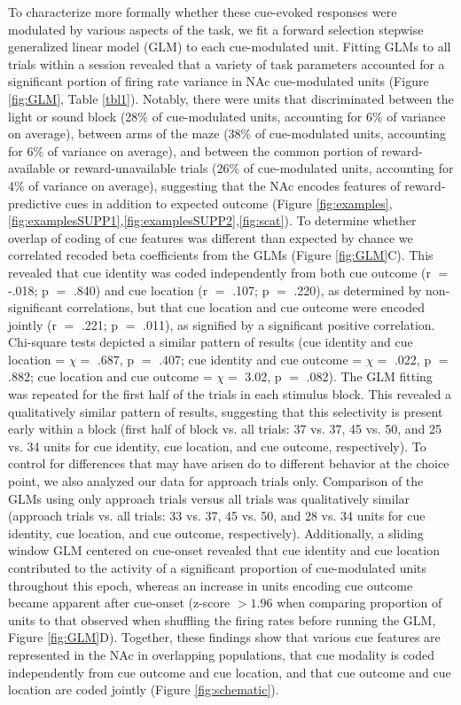 \documentclass[11pt]{article}
\begin{document}
To characterize more formally whether these cue-evoked responses were
modulated by various aspects of the task, we fit a forward selection
stepwise generalized linear model (GLM) to each cue-modulated
unit. Fitting GLMs to all trials within a session revealed that a
variety of task parameters accounted for a significant portion of
firing rate variance in NAc cue-modulated units (Figure \ref{fig:GLM},
Table \ref{tbl1}). Notably, there were units that discriminated
between the light or sound block (28\% of cue-modulated units,
accounting for 6\% of variance on average), between arms of the maze
(38\% of cue-modulated units, accounting for 6\% of variance on
average), and between the common portion of reward-available or
reward-unavailable trials (26\% of cue-modulated units, accounting for
4\% of variance on average), suggesting that the NAc encodes features
of reward-predictive cues in addition to expected outcome (Figure
\ref{fig:examples},\ref{fig:examplesSUPP1},\ref{fig:examplesSUPP2},\ref{fig:scat}). To
determine whether overlap of coding of cue features was different than
expected by chance we correlated recoded beta coefficients from the
GLMs (Figure \ref{fig:GLM}C). This revealed that cue identity was
coded independently from both cue outcome (r $=$ -.018; p $=$ .840)
and cue location (r $=$ .107; p $=$ .220), as determined by
non-significant correlations, but that cue location and cue outcome
were encoded jointly (r $=$ .221; p $=$ .011), as signified by a
significant positive correlation. Chi-square tests depicted a similar
pattern of results (cue identity and cue location = $\chi =$ .687, p
$=$ .407; cue identity and cue outcome = $\chi =$ .022, p $=$ .882;
cue location and cue outcome = $\chi =$ 3.02, p $=$ .082). The GLM
fitting was repeated for the first half of the trials in each stimulus
block. This revealed a qualitatively similar pattern of results,
suggesting that this selectivity is present early within a block
(first half of block vs. all trials: 37 vs. 37, 45 vs. 50, and 25
vs. 34 units for cue identity, cue location, and cue outcome,
respectively). To control for differences that may have arisen do to
different behavior at the choice point, we also analyzed our data for
approach trials only. Comparison of the GLMs using only approach
trials versus all trials was qualitatively similar (approach trials
vs. all trials: 33 vs. 37, 45 vs. 50, and 28 vs. 34 units for cue
identity, cue location, and cue outcome, respectively).  Additionally,
a sliding window GLM centered on cue-onset revealed that cue identity
and cue location contributed to the activity of a significant
proportion of cue-modulated units throughout this epoch, whereas an
increase in units encoding cue outcome became apparent after cue-onset
(z-score $>1.96$ when comparing proportion of units to that observed
when shuffling the firing rates before running the GLM, Figure
\ref{fig:GLM}D). Together, these findings show that various cue
features are represented in the NAc in overlapping populations, that
cue modality is coded independently from cue outcome and cue location,
and that cue outcome and cue location are coded jointly (Figure
\ref{fig:schematic}).
\end{document}
